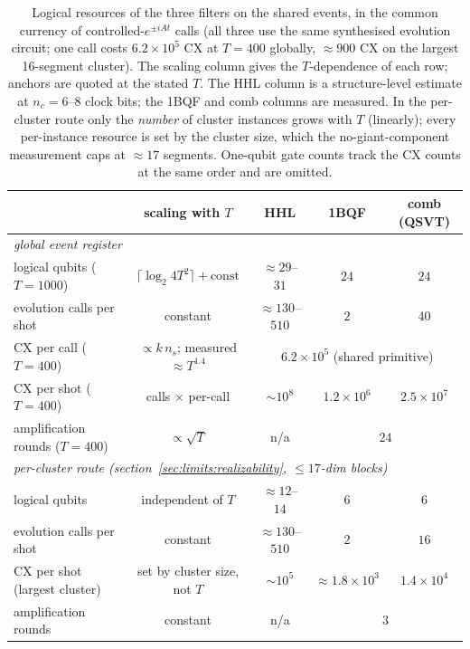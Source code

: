 \documentclass[11pt,a4paper]{article}
\begin{document}
\begin{table}[H]
\centering
\small
\begin{tabular}{lcccc}
\toprule
 & scaling with $T$ & HHL & 1BQF & comb (QSVT) \\
\midrule
\multicolumn{5}{l}{\emph{global event register}}\\
logical qubits ($T=1000$) & $\lceil\log_2 4T^2\rceil+\mathrm{const}$
 & $\approx29$--$31$ & $24$ & $24$ \\
evolution calls per shot & constant &
$\approx130$--$510$ & $2$ & $40$ \\
CX per call ($T=400$) & $\propto k\,n_s$; measured
$\approx T^{1.4}$ & \multicolumn{3}{c}{$6.2\times10^{5}$ (shared
primitive)} \\
CX per shot ($T=400$) & calls $\times$ per-call & $\sim10^{8}$ &
$1.2\times10^{6}$ & $2.5\times10^{7}$ \\
amplification rounds ($T=400$) & $\propto\sqrt T$ & n/a & \multicolumn{2}{c}{$24$} \\
\midrule
\multicolumn{5}{l}{\emph{per-cluster route
(section~\ref{sec:limits:realizability}, $\le17$-dim blocks)}}\\
logical qubits & independent of $T$ & $\approx12$--$14$ & $6$ & $6$ \\
evolution calls per shot & constant & $\approx130$--$510$ & $2$ & $16$ \\
CX per shot (largest cluster) & set by cluster size, not $T$ &
$\sim10^{5}$ & $\approx1.8\times10^{3}$ & $1.4\times10^{4}$ \\
amplification rounds & constant & n/a & \multicolumn{2}{c}{$3$} \\
\bottomrule
\end{tabular}
\caption{Logical resources of the three filters on the shared
events, in the common currency of controlled-$e^{\pm iAt}$ calls
(all three use the same synthesised evolution circuit; one call
costs $6.2\times10^{5}$ CX at $T=400$ globally, $\approx900$ CX on
the largest 16-segment cluster). The scaling column gives the
$T$-dependence of each row; anchors are quoted at the stated $T$.
The HHL column is a structure-level estimate at $n_c=6$--$8$ clock
bits; the 1BQF and comb columns are measured. In the per-cluster
route only the \emph{number} of cluster instances grows with $T$
(linearly); every per-instance resource is set by the cluster size,
which the no-giant-component measurement caps at $\approx17$
segments. One-qubit gate counts track the CX counts at the same
order and are omitted.}
\label{tab:resources}
\end{table}
\end{document}
